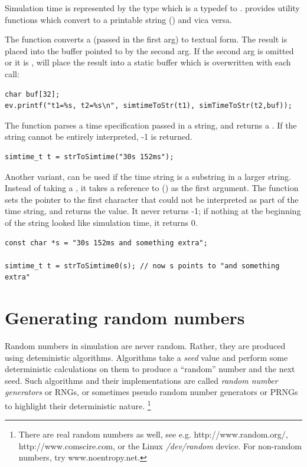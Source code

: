 Simulation time is represented by the type 
which is a typedef to .
{\opp} provides utility functions which convert 
to a printable string () and vica versa.

The  function converts a 
(passed in the first arg) to textual form. The result is placed into
the buffer pointed to by the second arg. If the second arg is omitted
or it is ,  will place the result into a
static buffer which is overwritten with each call:

\begin{verbatim}
char buf[32];
ev.printf("t1=%s, t2=%s\n", simtimeToStr(t1), simTimeToStr(t2,buf));
\end{verbatim}

The  function parses a time specification passed
in a string, and returns a . If the string cannot
be entirely interpreted, -1 is returned.

\begin{verbatim}
simtime_t t = strToSimtime("30s 152ms");
\end{verbatim}

Another variant,  can be used if the time
string is a substring in a larger string. Instead of taking a ,
it takes a reference to  () as the first argument.  The
function sets the pointer to the first character that could not be
interpreted as part of the time string, and returns the value. It
never returns -1; if nothing at the beginning of the string looked
like simulation time, it returns 0.

\begin{verbatim}
const char *s = "30s 152ms and something extra";

simtime_t t = strToSimtime0(s); // now s points to "and something extra"
\end{verbatim}


\section{Generating random numbers}

Random numbers in simulation are never random. Rather, they are
produced using deteministic algorithms. Algorithms take a \textit{seed} value
and perform some deterministic calculations on them to produce
a ``random'' number and the next seed. Such algorithms and their
implementations are called \textit{random number generators} or RNGs,
or sometimes pseudo random number generators or PRNGs to highlight
their deterministic nature.
  \footnote{There are real random numbers as well, see e.g.
  http://www.random.org/, http://www.comscire.com, or the Linux
  \textit{/dev/random} device. For non-random numbers, try www.noentropy.net.}

